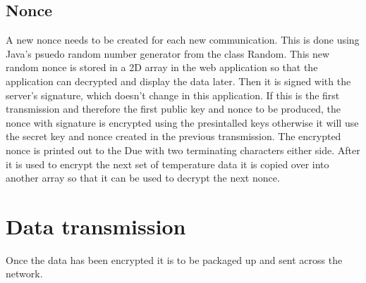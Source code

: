 \subsection{Nonce}
\label{nonce}

A new nonce needs to be created for each new communication. This is done using Java's psuedo random number generator from the class Random. This new random nonce is stored in a 2D array in the web application so that the application can decrypted and display the data later. Then it is signed with the server's signature, which doesn't change in this application. If this is the first transmission and therefore the first public key and nonce to be produced, the nonce with signature is encrypted using the presintalled keys otherwise it will use the secret key and nonce created in the previous transmission. The encrypted nonce is printed out to the Due with two terminating characters either side. After it is used to encrypt the next set of temperature data it is copied over into another array so that it can be used to decrypt the next nonce. 

\section{Data transmission}
Once the data has been encrypted it is to be packaged up and sent across the network.

